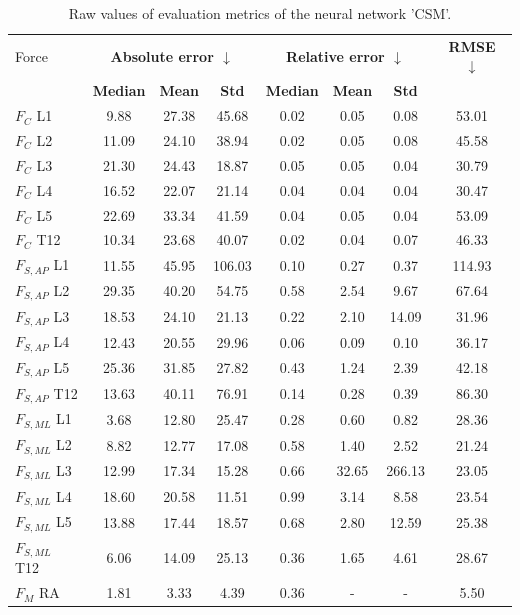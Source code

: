 \begin{table}[h]
\centering
\caption{Raw values of evaluation metrics of the neural network 'CSM'.}
\label{tab:prelim:csm.tex}
\begin{tabular}{lccccccc}
\toprule
Force & \multicolumn{3}{c}{\bfseries Absolute error $\downarrow$} & \multicolumn{3}{c}{\bfseries Relative error $\downarrow$} & \bfseries RMSE $\downarrow$ \\
  & \bfseries Median & \bfseries Mean & \bfseries Std & \bfseries Median & \bfseries Mean & \bfseries Std & \bfseries   \\
\midrule
$F_{C}$ L1 & 9.88 & 27.38 & 45.68 & 0.02 & 0.05 & 0.08 & 53.01 \\
$F_{C}$ L2 & 11.09 & 24.10 & 38.94 & 0.02 & 0.05 & 0.08 & 45.58 \\
$F_{C}$ L3 & 21.30 & 24.43 & 18.87 & 0.05 & 0.05 & 0.04 & 30.79 \\
$F_{C}$ L4 & 16.52 & 22.07 & 21.14 & 0.04 & 0.04 & 0.04 & 30.47 \\
$F_{C}$ L5 & 22.69 & 33.34 & 41.59 & 0.04 & 0.05 & 0.04 & 53.09 \\
$F_{C}$ T12 & 10.34 & 23.68 & 40.07 & 0.02 & 0.04 & 0.07 & 46.33 \\
$F_{S,AP}$ L1 & 11.55 & 45.95 & 106.03 & 0.10 & 0.27 & 0.37 & 114.93 \\
$F_{S,AP}$ L2 & 29.35 & 40.20 & 54.75 & 0.58 & 2.54 & 9.67 & 67.64 \\
$F_{S,AP}$ L3 & 18.53 & 24.10 & 21.13 & 0.22 & 2.10 & 14.09 & 31.96 \\
$F_{S,AP}$ L4 & 12.43 & 20.55 & 29.96 & 0.06 & 0.09 & 0.10 & 36.17 \\
$F_{S,AP}$ L5 & 25.36 & 31.85 & 27.82 & 0.43 & 1.24 & 2.39 & 42.18 \\
$F_{S,AP}$ T12 & 13.63 & 40.11 & 76.91 & 0.14 & 0.28 & 0.39 & 86.30 \\
$F_{S,ML}$ L1 & 3.68 & 12.80 & 25.47 & 0.28 & 0.60 & 0.82 & 28.36 \\
$F_{S,ML}$ L2 & 8.82 & 12.77 & 17.08 & 0.58 & 1.40 & 2.52 & 21.24 \\
$F_{S,ML}$ L3 & 12.99 & 17.34 & 15.28 & 0.66 & 32.65 & 266.13 & 23.05 \\
$F_{S,ML}$ L4 & 18.60 & 20.58 & 11.51 & 0.99 & 3.14 & 8.58 & 23.54 \\
$F_{S,ML}$ L5 & 13.88 & 17.44 & 18.57 & 0.68 & 2.80 & 12.59 & 25.38 \\
$F_{S,ML}$ T12 & 6.06 & 14.09 & 25.13 & 0.36 & 1.65 & 4.61 & 28.67 \\
$F_M$ RA & 1.81 & 3.33 & 4.39 & 0.36 & - & - & 5.50 \\

\end{tabular}
\end{table}
